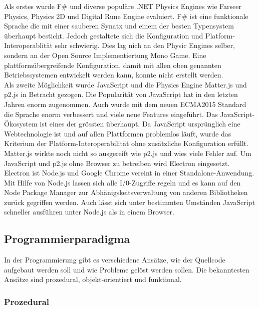     Als erstes wurde F\# und diverse populäre .NET Physics Engines wie Farseer Physics,
    Physics 2D und Digital Rune Engine evaluiert.
    F\# ist eine funktionale Sprache die mit einer sauberen Synatx und einem der besten Typensystem überhaupt besticht.
    Jedoch gestaltete sich die Konfiguration und Platform-Interoperablität sehr schwierig.
    Dies lag nich an den Physic Engines selber, sondern an der Open Source Implementiertung Mono Game.
    Eine plattformübergreifende Konfiguration,
    damit mit allen oben genannten Betriebssystemen entwickelt werden kann,
    konnte nicht erstellt werden.
    \\
    Als zweite Möglichkeit wurde JavaScript und die Physics Engine Matter.js und p2.js in Betracht gezogen.
    Die Popularität von JavaScript hat in den letzten Jahren enorm zugenommen.
    Auch wurde mit dem neuen ECMA2015 Standard die Sprache enorm verbessert und viele neue Features eingeführt.
    Das JavaScript-Ökosystem ist eines der grössten überhaupt.
    Da JavaScript ursprünglich eine Webtechnologie ist und auf allen Plattformen problemlos läuft,
    wurde das Kriterium der Platform-Interoperabilität ohne zusätzliche Konfiguration erfüllt.
    Matter.js wirkte noch nicht so ausgereift wie p2.js und wies viele Fehler auf.
    Um JavaScript und p2.js ohne Browser zu betreiben wird Electron eingesetzt.
    Electron ist Node.js und Google Chrome vereint in einer Standalone-Anwendung.
    Mit Hilfe von Node.js lassen sich alle I/0-Zugriffe regeln und es kann auf den
    Node Package Manager zur Abhänigskeitsverwaltung von anderen Bibliotheken zurück gegriffen werden.
    Auch lässt sich unter bestimmten Umständen JavaScript schneller ausführen unter Node.js als in einem Browser.

    \subsection{Programmierparadigma\label{sub:TechnologyParadigma}}

      In der Programmierung gibt es verschiedene Ansätze,
      wie der Quellcode aufgebaut werden soll und wie Probleme gelöst werden sollen.
      Die bekanntesten Ansätze sind prozedural, objekt-orientiert und funktional.

      \subsubsection{Prozedural\label{subsub:TechnologyParadigmaProzedural}}

